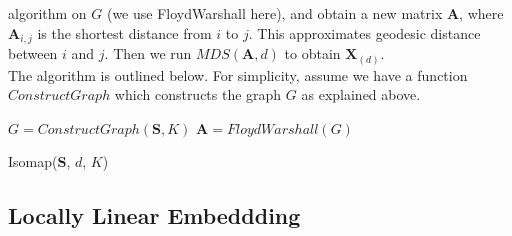 \documentclass[12pt]{report}
\begin{document}
algorithm on $G$ (we use FloydWarshall here), and obtain a new matrix 
$\mathbf{A}$, where $\mathbf{A}_{i,j}$ is the shortest distance from $i$ to $j$. 
This approximates geodesic distance between $i$ and $j$. 
Then we run $MDS(\mathbf{A}, d)$ to obtain $\mathbf{X}_{(d)}$. \\
The algorithm is outlined below. For simplicity, 
assume we have a function $ConstructGraph$ which 
constructs the graph $G$ as explained above.
\begin{algorithm}
    $G = ConstructGraph(\mathbf{S}, K)$\;
    $\mathbf{A} = FloydWarshall(G)$\;
    \caption{Isomap($\mathbf{S}$, $d$, $K$)}
\end{algorithm}

\newpage

\subsection{Locally Linear Embeddding}
\end{document}
